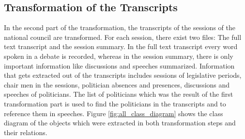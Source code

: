 

\subsection{Transformation of the Transcripts}
In the second part of the transformation, the transcripts of the sessions of the national council are transformed. For each session, there exist two files: The full text transcript and the session summary. In the full text transcript every word spoken in a debate is recorded, whereas in the session summary, there is only important information like discussions and speeches summarized. Information that gets extracted out of the transcripts includes sessions of legislative periods, chair men in the sessions, politician absences and presences, discussions and speeches of politicians. The list of politicians which was the result of the first transformation part is used to find the politicians in the transcripts and to reference them in speeches. %
Figure \ref{fig:all_class_diagram} shows the class diagram of the objects which were extracted in both transformation steps and their relations.



